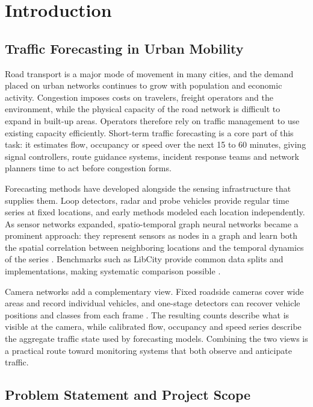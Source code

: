 \section{Introduction}\label{sec:intro}

\subsection{Traffic Forecasting in Urban Mobility}\label{sec:intro-background}

Road transport is a major mode of movement in many cities, and the demand
placed on urban networks continues to grow with population and economic
activity. Congestion imposes costs on travelers, freight operators and the
environment, while the physical capacity of the road network is difficult to
expand in built-up areas. Operators therefore rely on traffic management to use
existing capacity efficiently. Short-term traffic forecasting is a core part of
this task: it estimates flow, occupancy or speed over the next 15 to 60 minutes,
giving signal controllers, route guidance systems, incident response teams and
network planners time to act before congestion forms.

Forecasting methods have developed alongside the sensing infrastructure that
supplies them. Loop detectors, radar and probe vehicles provide regular time
series at fixed locations, and early methods modeled each location
independently. As sensor networks expanded, spatio-temporal graph neural
networks became a prominent approach: they represent sensors as nodes in a graph
and learn both the spatial correlation between neighboring locations and the
temporal dynamics of the series \parencite{yu2018stgcn,wu2019gwnet}. Benchmarks such as LibCity
provide common data splits and implementations, making systematic comparison
possible \parencite{wang2021libcity,jiang2023libcity}.

Camera networks add a complementary view. Fixed roadside cameras cover wide
areas and record individual vehicles, and one-stage detectors can recover
vehicle positions and classes from each frame \parencite{ultralytics2026yolo}.
The resulting counts describe what is visible at the camera, while calibrated
flow, occupancy and speed series describe the aggregate traffic state used by
forecasting models. Combining the two views is a practical route toward
monitoring systems that both observe and anticipate traffic.

\subsection{Problem Statement and Project Scope}\label{sec:intro-objectives}

